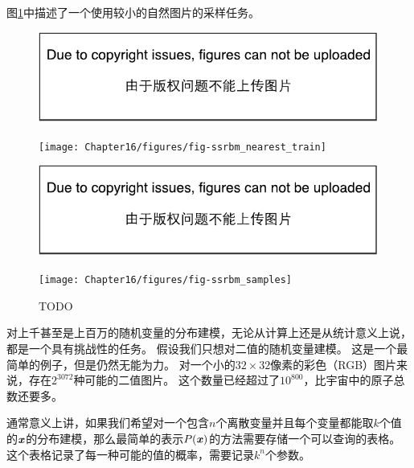 图\ref{fig:chap16_polar}中描述了一个使用较小的自然图片的采样任务。

\begin{figure}[!htb]
\ifOpenSource
\centerline{\includegraphics{figure.pdf}}
\else
	\centerline{\texttt{[image: Chapter16/figures/fig-ssrbm\_nearest\_train]}}
\fi
\ifOpenSource
\centerline{\includegraphics{figure.pdf}}
\else
	\centerline{\texttt{[image: Chapter16/figures/fig-ssrbm\_samples]}}	
\fi
	\caption{TODO}
	\label{fig:chap16_polar}
\end{figure}

对上千甚至是上百万的随机变量的分布建模，无论从计算上还是从统计意义上说，都是一个具有挑战性的任务。
假设我们只想对二值的随机变量建模。
这是一个最简单的例子，但是仍然无能为力。
对一个小的$32\times 32$像素的彩色（RGB）图片来说，存在$2^{3072}$种可能的二值图片。
这个数量已经超过了$10^{800}$，比宇宙中的原子总数还要多。

通常意义上讲，如果我们希望对一个包含$n$个离散变量并且每个变量都能取$k$个值的$\boldsymbol{\mathit{x}}$的分布建模，那么最简单的表示$P(\boldsymbol{\mathit{x}})$的方法需要存储一个可以查询的表格。
这个表格记录了每一种可能的值的概率，需要记录$k^n$个参数。

